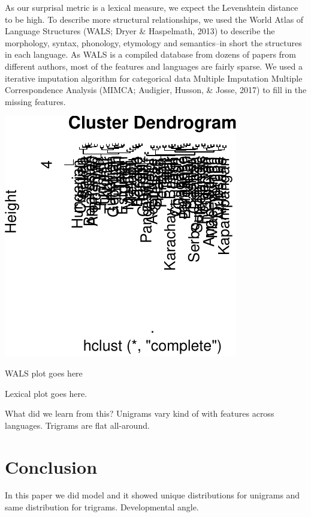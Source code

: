 \documentclass[10pt, letterpaper]{article}
\newenvironment{CodeChunk}{}{}
\begin{document}
As our surprisal metric is a lexical measure, we expect the Levenshtein
distance to be high. To describe more structural relationships, we used
the World Atlas of Language Structures (WALS; Dryer \& Haspelmath, 2013)
to describe the morphology, syntax, phonology, etymology and
semantics--in short the structures in each language. As WALS is a
compiled database from dozens of papers from different authors, most of
the features and languages are fairly sparse. We used a iterative
imputation algorithm for categorical data Multiple Imputation Multiple
Correspondence Analysis (MIMCA; Audigier, Husson, \& Josse, 2017) to
fill in the missing features.

\begin{CodeChunk}

\includegraphics{figs/dendro-1} \end{CodeChunk}

WALS plot goes here

Lexical plot goes here.

What did we learn from this? Unigrams vary kind of with features across
languages. Trigrams are flat all-around.

\hypertarget{conclusion}{%
\section{Conclusion}\label{conclusion}}

In this paper we did model and it showed unique distributions for
unigrams and same distribution for trigrams. Developmental angle.
\end{document}
